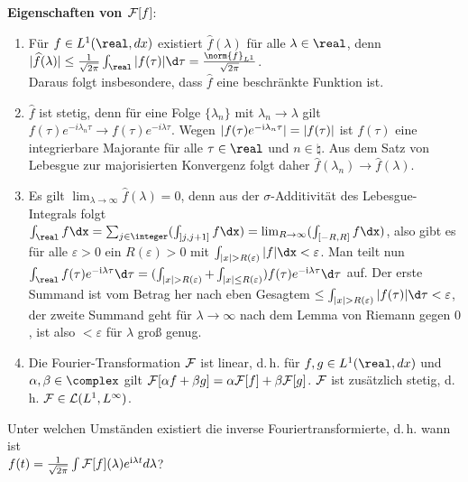 \textbf{Eigenschaften von $\mathcal{F}[f]$}:
\begin{enumerate}
    \item
    Für $f \in L^1(\real, dx)$ existiert $\widehat{f}(\lambda)$ für alle
    $\lambda \in \real$, denn
    $|\widehat{f}(\lambda)| \le
    \frac{1}{\sqrt{2\pi}} \int_\real |f(\tau)| \d\tau =
    \frac{\norm{f}_{L^1}}{\sqrt{2\pi}}$.\\
    Daraus folgt insbesondere, dass
    $\widehat{f}$ eine beschränkte Funktion ist.

    \item
    $\widehat{f}$ ist stetig, denn für eine Folge
    $\{\lambda_n\}$ mit $\lambda_n \to \lambda$ gilt
    $f(\tau) e^{-i \lambda_n \tau} \to f(\tau) e^{-i \lambda \tau}$.
    Wegen $|f(\tau) e^{-\mathrm{i} \lambda_n \tau}| = |f(\tau)|$ ist
    $f(\tau)$ eine integrierbare Majorante für alle $\tau \in \real$ und
    $n \in \natural$.
    Aus dem Satz von Lebesgue zur majorisierten Konvergenz folgt daher
    $\widehat{f}(\lambda_n) \to \widehat{f}(\lambda)$.

    \item
    Es gilt $\lim_{\lambda \to \infty} \widehat{f}(\lambda) = 0$, denn
    aus der $\sigma$-Additivität des Lebesgue-Integrals folgt\\
    $\int_\real f \dx =
    \sum_{j \in \integer} (\int_{\left]j, j + 1\right]} f\dx) =
    \lim_{R \to \infty} (\int_{[-R, R]} f\dx)$, also gibt es für alle
    $\varepsilon > 0$ ein $R(\varepsilon) > 0$ mit
    $\int_{|x| > R(\varepsilon)} |f|\dx < \varepsilon$.
    Man teilt nun $\int_\real f(\tau) e^{-\i \lambda\tau} \d\tau =
    (\int_{|x| > R(\varepsilon)} + \int_{|x| \le R(\varepsilon)})
    f(\tau) e^{-\i \lambda\tau} \d\tau$ auf.
    Der erste Summand ist vom Betrag her nach eben Gesagtem
    $\le \int_{|x| > R(\varepsilon)} |f(\tau)| \d\tau < \varepsilon$,
    der zweite Summand geht für $\lambda \to \infty$ nach dem Lemma von
    Riemann gegen $0$, ist also $< \varepsilon$ für $\lambda$ groß genug.

    \item
    Die Fourier-Transformation $\mathcal{F}$ ist linear, d.\,h. für
    $f, g \in L^1(\real, dx)$ und $\alpha, \beta \in \complex$ gilt
    $\mathcal{F}[\alpha f + \beta g] = \alpha \mathcal{F}[f] + \beta \mathcal{F}[g]$.
    $\mathcal{F}$ ist zusätzlich stetig, d.\,h. $\mathcal{F} \in \mathcal{L}(L^1, L^\infty)$.
\end{enumerate}

\linie

Unter welchen Umständen existiert die inverse Fouriertransformierte, d.\,h.
wann ist\\
$f(t) = \frac{1}{\sqrt{2\pi}}
\int \mathcal{F}[f](\lambda) e^{\mathrm{i} \lambda t} d\lambda$?

